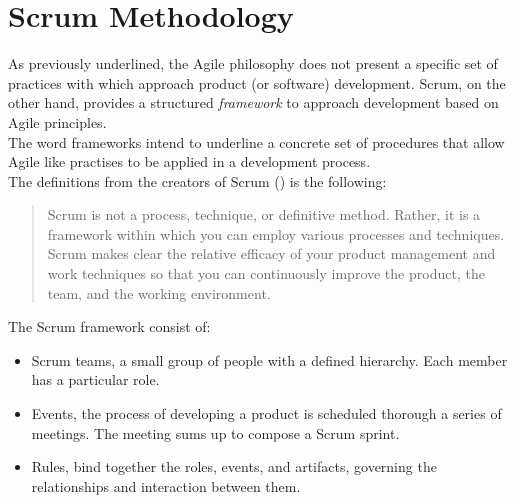 \documentclass[../main.tex]{subfiles}
\newcommand\connecttw[2]%
  {\draw[->,thick] (#1) -| (#2);
   \draw[->,thick] (#2) -| (#1);
  }
\begin{document}
\section{Scrum Methodology}
As previously underlined, the Agile philosophy does not present a specific set of practices with which approach product (or software) development. Scrum, on the other hand, provides a structured \textit{framework} to approach development based on Agile principles.\\
The word frameworks intend to underline a concrete set of procedures that allow Agile like practises to be applied in a development process.\\
The definitions from the creators of Scrum (\citet{Scrum}) is the following:
\begin{quote}
Scrum is not a process, technique, or definitive method. Rather, it is a framework within which you can employ various processes and techniques. Scrum makes clear the relative efficacy of your product management and work techniques so that you can continuously improve the product, the team, and the working environment.
\end{quote}
The Scrum framework consist of:
\begin{itemize}
    \item Scrum teams, a small group of people with a defined hierarchy. Each member has a particular role. 
    \item Events, the process of developing a product is scheduled thorough a series of meetings. The meeting sums up to compose a Scrum sprint.
    \item Rules, bind together the roles, events, and artifacts, governing the relationships and interaction between them.
\end{itemize}
\end{document}
